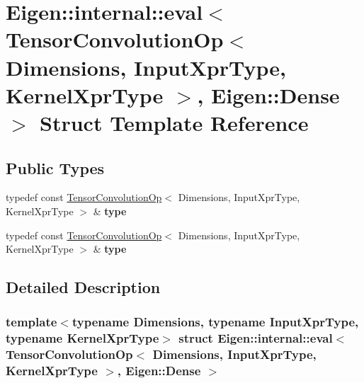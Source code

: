 \hypertarget{struct_eigen_1_1internal_1_1eval_3_01_tensor_convolution_op_3_01_dimensions_00_01_input_xpr_type57757a1b6151765c50323fde8ef0519e}{}\section{Eigen\+:\+:internal\+:\+:eval$<$ Tensor\+Convolution\+Op$<$ Dimensions, Input\+Xpr\+Type, Kernel\+Xpr\+Type $>$, Eigen\+:\+:Dense $>$ Struct Template Reference}
\label{struct_eigen_1_1internal_1_1eval_3_01_tensor_convolution_op_3_01_dimensions_00_01_input_xpr_type57757a1b6151765c50323fde8ef0519e}
\subsection*{Public Types}
\begin{DoxyCompactItemize}
\item 
\mbox{\label{struct_eigen_1_1internal_1_1eval_3_01_tensor_convolution_op_3_01_dimensions_00_01_input_xpr_type57757a1b6151765c50323fde8ef0519e_a8f7e34df6ea8af751c0a567532806aca}} 
typedef const \hyperlink{class_eigen_1_1_tensor_convolution_op}{Tensor\+Convolution\+Op}$<$ Dimensions, Input\+Xpr\+Type, Kernel\+Xpr\+Type $>$ \& {\bfseries type}
\item 
\mbox{\label{struct_eigen_1_1internal_1_1eval_3_01_tensor_convolution_op_3_01_dimensions_00_01_input_xpr_type57757a1b6151765c50323fde8ef0519e_a8f7e34df6ea8af751c0a567532806aca}} 
typedef const \hyperlink{class_eigen_1_1_tensor_convolution_op}{Tensor\+Convolution\+Op}$<$ Dimensions, Input\+Xpr\+Type, Kernel\+Xpr\+Type $>$ \& {\bfseries type}
\end{DoxyCompactItemize}


\subsection{Detailed Description}
\subsubsection*{template$<$typename Dimensions, typename Input\+Xpr\+Type, typename Kernel\+Xpr\+Type$>$\newline
struct Eigen\+::internal\+::eval$<$ Tensor\+Convolution\+Op$<$ Dimensions, Input\+Xpr\+Type, Kernel\+Xpr\+Type $>$, Eigen\+::\+Dense $>$}



